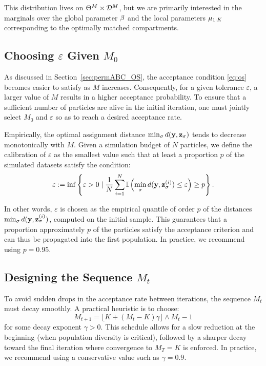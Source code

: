 This distribution lives on \( \Theta^M \times \mathcal{D}^M \), but we are primarily interested in the marginals over the global parameter \( \beta \) and the local parameters \( \mu_{1:K} \) corresponding to the optimally matched compartments.

\subsection{Choosing \( \varepsilon \) Given \( M_0 \)}

As discussed in Section~\ref{sec:permABC_OS}, the acceptance condition \eqref{eq:os} becomes easier to satisfy as \( M \) increases. Consequently, for a given tolerance \( \varepsilon \), a larger value of \( M \) results in a higher acceptance probability. To ensure that a sufficient number of particles are alive in the initial iteration, one must jointly select \( M_0 \) and \( \varepsilon \) so as to reach a desired acceptance rate.

Empirically, the optimal assignment distance \( \min_{\sigma} d(\mathbf{y}, \mathbf{z}_\sigma) \) tends to decrease monotonically with \( M \). Given a simulation budget of \( N \) particles, we define the calibration of \( \varepsilon \) as the smallest value such that at least a proportion \( p \) of the simulated datasets satisfy the condition:
\[
\varepsilon := \inf \left\{ \varepsilon > 0 \mid \frac{1}{N} \sum_{i=1}^N \mathbb{I} \left( \min_\sigma d(\mathbf{y}, \mathbf{z}^{(i)}_\sigma) \leq \varepsilon \right) \geq p \right\}.
\]

In other words, \( \varepsilon \) is chosen as the empirical quantile of order \( p \) of the distances \( \min_\sigma d(\mathbf{y}, \mathbf{z}^{(i)}_\sigma) \), computed on the initial sample. This guarantees that a proportion approximately $p$ of the particles satisfy the acceptance criterion and can thus be propagated into the first population. In practice, we recommend using \( p = 0.95 \).

\subsection{Designing the Sequence \( M_t \)}

To avoid sudden drops in the acceptance rate between iterations, the sequence \( M_t \) must decay smoothly. A practical heuristic is to choose:
\[
M_{t+1} = \lfloor K + (M_t - K) \gamma \rfloor \wedge M_t -1
\]
for some decay exponent \( \gamma > 0 \). This schedule allows for a slow reduction at the beginning (when population diversity is critical), followed by a sharper decay toward the final iteration where convergence to \( M_T = K \) is enforced. In practice, we recommend using a conservative value such as \( \gamma = 0.9 \).

